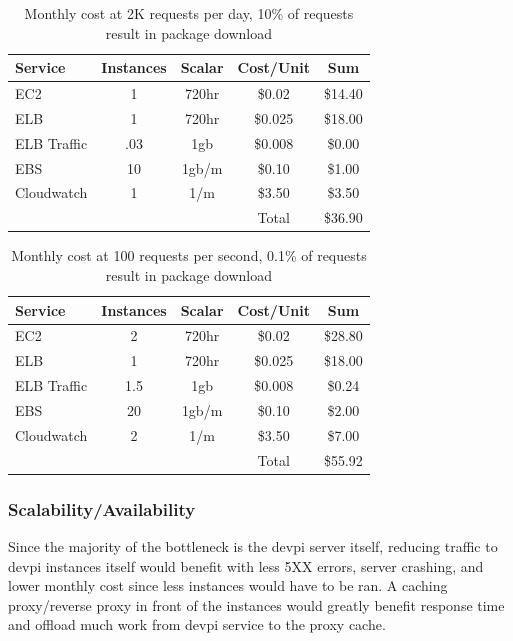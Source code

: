 \documentclass[12pt, letterpaper]{article}
\begin{document}
\begin{table}[H]
    \caption{Monthly cost at 2K requests per day, 10\% of requests result in package download}
\begin{center}
    \begin{tabular}{l c c c c}
        Service     & Instances & Scalar  & Cost/Unit & Sum     \\
        \hline
        EC2         & 1         & 720hr   & \$0.02    & \$14.40 \\
        ELB         & 1         & 720hr   & \$0.025   & \$18.00 \\
        ELB Traffic & .03       & 1gb     & \$0.008   & \$0.00  \\
        EBS         & 10        & 1gb/m   & \$0.10    & \$1.00  \\
        Cloudwatch  & 1         & 1/m     & \$3.50    & \$3.50  \\
        \hline
                    &           &         & Total     & \$36.90
    \end{tabular}
\end{center}
\end{table}

\begin{table}[H]
    \caption{Monthly cost at 100 requests per second, 0.1\% of requests result in package download}
\begin{center}
    \begin{tabular}{l c c c c}
        Service     & Instances & Scalar  & Cost/Unit & Sum     \\
        \hline
        EC2         & 2         & 720hr   & \$0.02    & \$28.80 \\
        ELB         & 1         & 720hr   & \$0.025   & \$18.00 \\
        ELB Traffic & 1.5      & 1gb     & \$0.008   & \$0.24  \\
        EBS         & 20        & 1gb/m   & \$0.10    & \$2.00  \\
        Cloudwatch  & 2         & 1/m     & \$3.50    & \$7.00  \\
        \hline
                    &           &         & Total     & \$55.92
    \end{tabular}
\end{center}
\end{table}


\subsubsection{Scalability/Availability}
Since the majority of the bottleneck is the devpi server itself, reducing traffic to devpi instances itself would benefit with less
5XX errors, server crashing, and lower monthly cost since less instances would have to be ran. A caching proxy/reverse proxy in front
of the instances would greatly benefit response time and offload much work from devpi service to the proxy cache.
\end{document}
